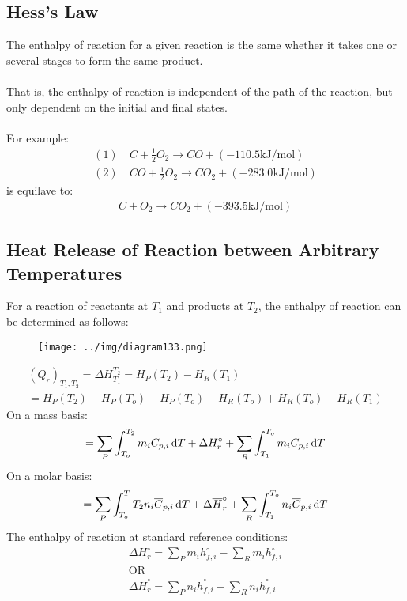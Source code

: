 \documentclass[class=report, crop=false, 12pt,a4paper]{standalone}
\numberwithin{equation}{section}
\begin{document}
\subsection{Hess’s Law}
The enthalpy of reaction for a given reaction is the same whether it takes one or several stages to form the same product. \\\\
That is, the enthalpy of reaction is independent of the path of the reaction, but only dependent on the initial and final states. \\\\
For example:
\begin{align}
  (1) &\ C+\frac{1}{2}O_2 \longrightarrow CO + (-110.5 \si{\kilo\joule\per\mole}) \\[5pt]
  (2) &\ CO + \frac{1}{2}O_2 \longrightarrow CO_2 + (-283.0 \si{\kilo\joule\per\mole})
\end{align}
is equilave to:
\begin{gather}
  C + O_2 \longrightarrow CO_2 + (-393.5 \si{\kilo\joule\per\mole})
\end{gather}
\subsection{Heat Release of Reaction between Arbitrary Temperatures}
For a reaction of reactants at $T_1$ and products at $T_2$, the enthalpy of reaction can be determined as follows:
\begin{figure}[H]
  \centering
  \texttt{[image: ../img/diagram133.png]}
  \caption{}
\end{figure}
\begin{gather}
  (Q_r)_{T_1,T_2} = \Delta H_{T_1}^{T_2} = H_P(T_2) - H_R(T_1) \\[5pt]
  = H_P(T_2) - H_P(T_o) + H_P(T_o) - H_R(T_o) + H_R(T_o) - H_R(T_1)
\end{gather}
On a mass basis:
\begin{gather}
  = \sum_{P}\int_{T_o}^{T_2}m_i C_{p,i}\dif T + \Delta H_r^\circ + \sum_{R}\int_{T_1}^{T_o}m_i C_{p,i} \dif T
\end{gather}
On a molar basis:
\begin{gather}
  = \sum_{P}\int_{T_o}^T{T_2}n_i \overline{C}_{p,i} \dif T + \Delta\overline{H}_r^\circ + \sum_{R}\int_{T_1}^{T_o}n_i \overline{C}_{p,i} \dif T 
\end{gather}
The enthalpy of reaction at standard reference conditions:
\begin{gather}
  \Delta H_r^\circ = \sum_{P}m_i h_{f,i}^\circ - \sum_{R}m_i h_{f,i}^\circ \\[5pt]
  \text{OR} \\[5pt]
  \Delta\overline{H}_r^\circ = \sum_{P}n_i\overline{h}_{f,i}^\circ - \sum_{R}n_i\overline{h}_{f,i}^\circ
\end{gather}
\end{document}
